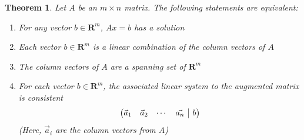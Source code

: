 \documentclass[12pt]{article}
\makeatletter
\numberwithin{equation}{subsection}
\numberwithin{figure}{subsection}
\newtheorem{thm}[subsection]{Theorem}
\theoremstyle{note}
\newenvironment{amatrix}[1]{%
  \left(\begin{array}{@{}*{#1}{c}|c@{}}
}{%
  \end{array}\right)
}
\makeatother
\begin{document}
\begin{thm} \label{thm-range-of-A}
	Let $A$ be an $m\times n$ matrix. The following statements are equivalent: 
	\begin{enumerate}[label=(\roman*)]
		\item For any vector $b\in\mathbf{R}^m$, ${Ax}={b}$ has a solution
		\item Each vector ${b} \in \mathbf{R}^m$ is a linear combination of the column vectors of $A$
		\item The column vectors of $A$ are a spanning set of $\mathbf{R}^m$
		\item For each vector ${b} \in \mathbf{R}^m$, the associated linear system to the augmented matrix is consistent\[ \begin{amatrix}{4} \vec{a}_1 & \vec{a}_2 & \cdots & \vec{a_n} & {b}\end{amatrix}\] (Here, $\vec{a}_i$ are the column vectors from $A$)
	\end{enumerate}
\end{thm} 
\end{document}
